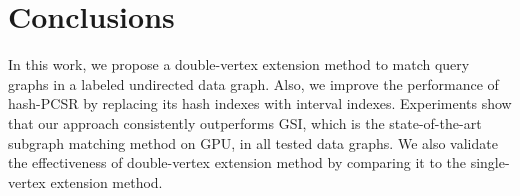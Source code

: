 
\section{Conclusions}
In this work, we propose a double-vertex extension method to match query graphs in a labeled undirected data graph. Also, we improve the performance of hash-PCSR by replacing its hash indexes with interval indexes. Experiments show that our approach consistently outperforms GSI, which is the state-of-the-art subgraph matching method on GPU, in all tested data graphs. We also validate the effectiveness of double-vertex extension method by comparing it to the single-vertex extension method.
